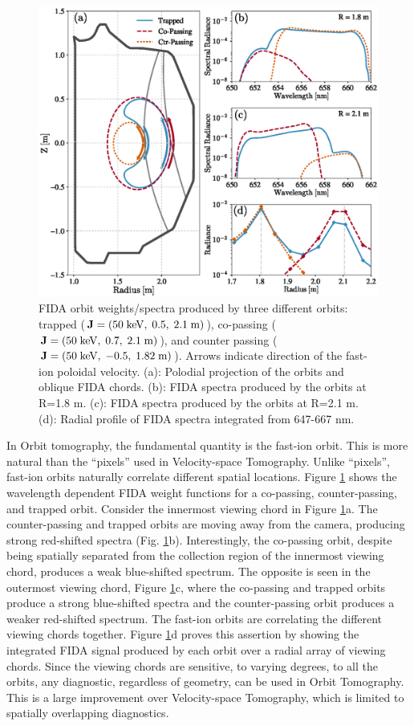 \begin{figure}[h!]
    \centering
    \includegraphics[width=15cm]{figures/orbit_fida_spectra.eps}
    \caption{FIDA orbit weights/spectra produced by three different orbits: trapped ($\rm{\mathbf{J}=(50\;keV,\;0.5,\;2.1\;m)}$), co-passing ($\rm{\mathbf{J}=(50\;keV,\;0.7,\;2.1\;m)}$), and counter passing ($\rm{\mathbf{J}=(50\;keV,\;-0.5,\;1.82\;m)}$). Arrows indicate direction of the fast-ion poloidal velocity. (a): Polodial projection of the orbits and oblique FIDA chords. (b): FIDA spectra produced by the orbits at R=1.8 m. (c): FIDA spectra produced by the orbits at R=2.1 m. (d): Radial profile of FIDA spectra integrated from 647-667 nm.}
    \label{fig:orbit_fida_spectra}
\end{figure}
In Orbit tomography, the fundamental quantity is the fast-ion orbit. This is more natural than the ``pixels'' used in Velocity-space Tomography. Unlike ``pixels'', fast-ion orbits naturally correlate different spatial locations.
Figure \ref{fig:orbit_fida_spectra} shows the wavelength dependent FIDA weight functions for a co-passing, counter-passing, and trapped orbit. Consider the innermost viewing chord in Figure \ref{fig:orbit_fida_spectra}a. The counter-passing and trapped orbits are moving away from the camera, producing strong red-shifted spectra (Fig. \ref{fig:orbit_fida_spectra}b). Interestingly, the co-passing orbit, despite being spatially separated from the collection region of the innermost viewing chord, produces a weak blue-shifted spectrum. The opposite is seen in the outermost viewing chord, Figure \ref{fig:orbit_fida_spectra}c, where the co-passing and trapped orbits produce a strong blue-shifted spectra and the counter-passing orbit produces a weaker red-shifted spectrum. The fast-ion orbits are correlating the different viewing chords together. Figure \ref{fig:orbit_fida_spectra}d proves this assertion by showing the integrated FIDA signal produced by each orbit over a radial array of viewing chords. Since the viewing chords are sensitive, to varying degrees, to all the orbits, any diagnostic, regardless of geometry, can be used in Orbit Tomography. This is a large improvement over Velocity-space Tomography, which is limited to spatially overlapping diagnostics. 

